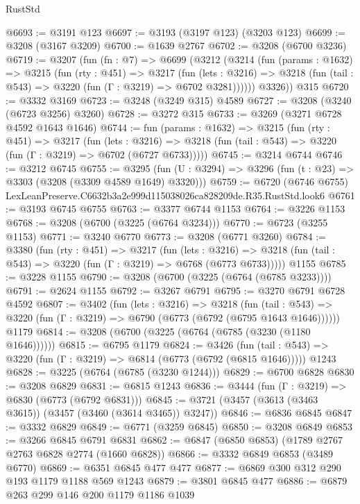 \begin{lexlean}{RustStd}
\begin{coremodule}
@6693 := @3191 @123
@6697 := @3193 (@3197 @123) (@3203 @123)
@6699 := @3208 (@3167 @3209)
@6700 := @1639 @2767
@6702 := @3208 (@6700 @3236)
@6719 := @3207
    (fun (fn : @7) =>
    @6699
      (@3212
        (@3214
          (fun (params : @1632) =>
          @3215
            (fun (rty : @451) =>
            @3217
              (fun (lets : @3216) =>
              @3218 (fun (tail : @543) => @3220 (fun (Γ : @3219) => @6702 @3281))))))
        @3326))
    @315
@6720 := @3332 @3169
@6723 := @3248 (@3249 @315) @4589
@6727 := @3208 (@3240 (@6723 @3256) @3260)
@6728 := @3272 @315
@6733 := @3269 (@3271 @6728 @4592 @1643 @1646)
@6744 := fun (params : @1632) =>
  @3215
    (fun (rty : @451) =>
    @3217
      (fun (lets : @3216) =>
      @3218 (fun (tail : @543) => @3220 (fun (Γ : @3219) => @6702 (@6727 @6733)))))
@6745 := @3214 @6744
@6746 := @3212 @6745
@6755 := @3295 (fun (U : @3294) => @3296 (fun (t : @23) => @3303 (@3208 (@3309 @4589 @1649) @3320)))
@6759 := @6720 (@6746 @6755) LexLeanPreserve.C6632b3a2e999d115038026ca828209de.R35.RustStd.look6
@6761 := @3193 @6745 @6755
@6763 := @3377 @6744 @1153
@6764 := @3226 @1153
@6768 := @3208 (@6700 (@3225 (@6764 @3234)))
@6770 := @6723 (@3255 @1153)
@6771 := @3240 @6770
@6773 := @3208 (@6771 @3260)
@6784 := @3380
    (fun (rty : @451) =>
    @3217
      (fun (lets : @3216) =>
      @3218 (fun (tail : @543) => @3220 (fun (Γ : @3219) => @6768 (@6773 @6733)))))
    @1155
@6785 := @3228 @1155
@6790 := @3208 (@6700 (@3225 (@6764 (@6785 @3233))))
@6791 := @2624 @1155
@6792 := @3267 @6791
@6795 := @3270 @6791 @6728 @4592
@6807 := @3402
    (fun (lets : @3216) =>
    @3218
      (fun (tail : @543) => @3220 (fun (Γ : @3219) => @6790 (@6773 (@6792 (@6795 @1643 @1646))))))
    @1179
@6814 := @3208 (@6700 (@3225 (@6764 (@6785 (@3230 (@1180 @1646))))))
@6815 := @6795 @1179
@6824 := @3426
    (fun (tail : @543) => @3220 (fun (Γ : @3219) => @6814 (@6773 (@6792 (@6815 @1646)))))
    @1243
@6828 := @3225 (@6764 (@6785 (@3230 @1244)))
@6829 := @6700 @6828
@6830 := @3208 @6829
@6831 := @6815 @1243
@6836 := @3444 (fun (Γ : @3219) => @6830 (@6773 (@6792 @6831)))
@6845 := @3721 (@3457 (@3613 (@3463 @3615)) (@3457 (@3460 (@3614 @3465)) @3247))
@6846 := @6836 @6845
@6847 := @3332 @6829
@6849 := @6771 (@3259 @6845)
@6850 := @3208 @6849
@6853 := @3266 @6845 @6791 @6831
@6862 := @6847 (@6850 @6853) (@1789 @2767 @2763 @6828 @2774 (@1660 @6828))
@6866 := @3332 @6849 @6853 (@3489 @6770)
@6869 := @6351 @6845 @477 @477
@6877 := @6869 @300 @312 @290 @193 @1179 @1188 @569 @1243
@6879 := @3801 @6845 @477
@6886 := @6879 @263 @299 @146 @200 @1179 @1186 @1039

\end{coremodule}
\end{lexlean}
